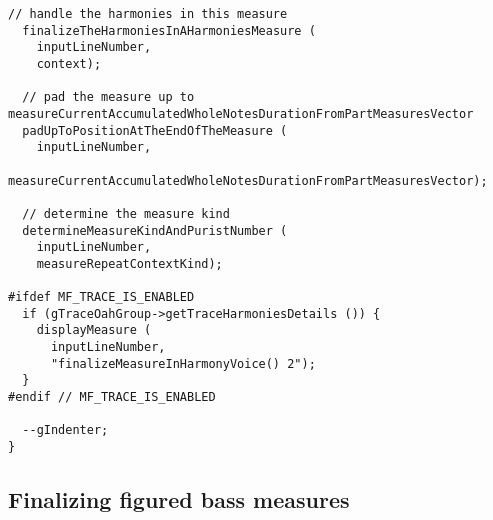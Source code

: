 \begin{lstlisting}[language=CPlusPlus]
  // handle the harmonies in this measure
  finalizeTheHarmoniesInAHarmoniesMeasure (
    inputLineNumber,
    context);

  // pad the measure up to measureCurrentAccumulatedWholeNotesDurationFromPartMeasuresVector
  padUpToPositionAtTheEndOfTheMeasure (
    inputLineNumber,
    measureCurrentAccumulatedWholeNotesDurationFromPartMeasuresVector);

  // determine the measure kind
  determineMeasureKindAndPuristNumber (
    inputLineNumber,
    measureRepeatContextKind);

#ifdef MF_TRACE_IS_ENABLED
  if (gTraceOahGroup->getTraceHarmoniesDetails ()) {
    displayMeasure (
      inputLineNumber,
      "finalizeMeasureInHarmonyVoice() 2");
  }
#endif // MF_TRACE_IS_ENABLED

  --gIndenter;
}
\end{lstlisting}


\subsection{Finalizing figured bass measures}

